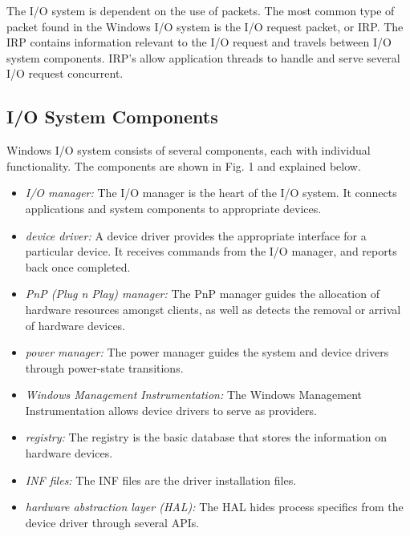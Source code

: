 \documentclass[10pt, onecolumn]{IEEEtran}
\begin{document}
        The I/O system is dependent on the use of packets. The most common type of packet found in the Windows I/O system is the I/O request packet, or IRP. The IRP contains information relevant to the I/O request and travels between I/O system components. IRP's allow application threads to handle and serve several I/O request concurrent.
        
        \subsection{I/O System Components}
            Windows I/O system consists of several components, each with individual functionality. The components are shown in Fig. 1 and explained below.
            
            \begin{itemize}
                \item \textit{I/O manager:} The I/O manager is the heart of the I/O system. It connects applications and system components to appropriate devices.
                \item \textit{device driver:} A device driver provides the appropriate interface for a particular device. It receives commands from the I/O manager, and reports back once completed. 
                \item \textit{PnP (Plug n Play) manager:} The PnP manager guides the allocation of hardware resources amongst clients, as well as detects the removal or arrival of hardware devices.
                \item \textit{power manager:} The power manager guides the system and device drivers through power-state transitions.
                \item \textit{Windows Management Instrumentation:} The Windows Management Instrumentation allows device drivers to serve as providers.
                \item \textit{registry:} The registry is the basic database that stores the information on hardware devices.
                \item \textit{INF files:} The INF files are the driver installation files.
                \item \textit{hardware abstraction layer (HAL):} The HAL hides process specifics from the device driver through several APIs.
            \end{itemize}
		
\end{document}
